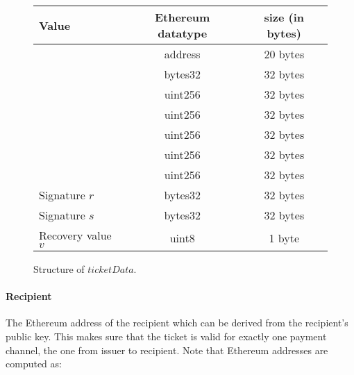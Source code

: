 \begin{figure}[H]
      \centering
      \begin{tabular}{|l|c|c|}
            \hline
            \textbf{Value}                                    & \textbf{Ethereum datatype} & \textbf{size (in bytes)} \\
            \hline
            \hline
            \nameref{sec:tickets:issuance:recipient}          & address                    & 20 bytes                 \\
            \nameref{sec:tickets:issuance:challenge}          & bytes32                    & 32 bytes                 \\
            \nameref{sec:tickets:issuance:ticketepoch}        & uint256                    & 32 bytes                 \\
            \nameref{sec:tickets:issuance:ticketvalue}        & uint256                    & 32 bytes                 \\
            \nameref{sec:tickets:issuance:winningprobability} & uint256                    & 32 bytes                 \\
            \nameref{sec:tickets:issuance:ticketindex}        & uint256                    & 32 bytes                 \\
            \nameref{sec:tickets:issuance:channelepoch}       & uint256                    & 32 bytes                 \\
            \hline
            \hline
            Signature $r$                                     & bytes32                    & 32 bytes                 \\
            Signature $s$                                     & bytes32                    & 32 bytes                 \\
            Recovery value $v$                                & uint8                      & 1 byte                   \\
            \hline
      \end{tabular}
      \caption{Structure of $ticketData$.}
\end{figure}

\paragraph{Recipient}
\label{sec:tickets:issuance:recipient}

The Ethereum address of the recipient which can be derived from the recipient's public key. This makes sure that the ticket is valid for exactly one payment channel, the one from issuer to recipient. Note that Ethereum addresses are computed as:

